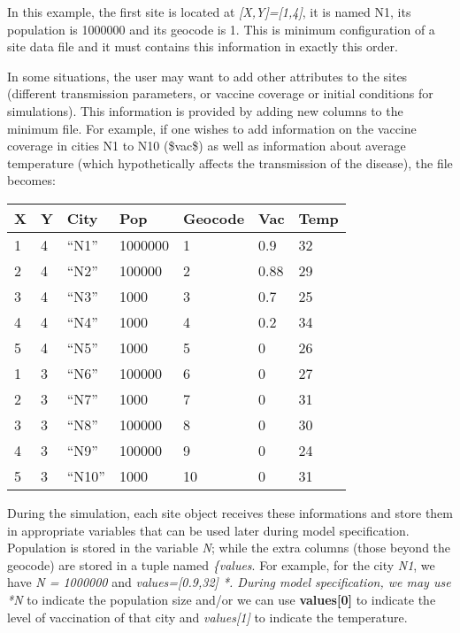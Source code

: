 \documentclass[a4paper,10pt]{manual}
\begin{document}
In this example, the first site is located at \emph{{[}X,Y{]}={[}1,4{]}}, it is named N1, its population is 1000000 and its geocode is 1. This is minimum configuration of a site data file and it must contains this information in exactly this order.

In some situations, the user may want to add other attributes to the sites (different transmission parameters, or vaccine coverage or initial conditions for simulations). This information is provided by adding new columns to the minimum file. For example, if one wishes to add information on the vaccine coverage in cities N1 to N10 (\$vac\$) as well as information about average temperature (which hypothetically affects the transmission of the disease), the file becomes:

\begin{tabulary}{\textwidth}{|L|L|L|L|L|L|L|}
\hline
\textbf{
X
} & \textbf{
Y
} & \textbf{
City
} & \textbf{
Pop
} & \textbf{
Geocode
} & \textbf{
Vac
} & \textbf{
Temp
}\\
\hline

1
 & 
4
 & 
``N1''
 & 
1000000
 & 
1
 & 
0.9
 & 
32
\\

2
 & 
4
 & 
``N2''
 & 
100000
 & 
2
 & 
0.88
 & 
29
\\

3
 & 
4
 & 
``N3''
 & 
1000
 & 
3
 & 
0.7
 & 
25
\\

4
 & 
4
 & 
``N4''
 & 
1000
 & 
4
 & 
0.2
 & 
34
\\

5
 & 
4
 & 
``N5''
 & 
1000
 & 
5
 & 
0
 & 
26
\\

1
 & 
3
 & 
``N6''
 & 
100000
 & 
6
 & 
0
 & 
27
\\

2
 & 
3
 & 
``N7''
 & 
1000
 & 
7
 & 
0
 & 
31
\\

3
 & 
3
 & 
``N8''
 & 
100000
 & 
8
 & 
0
 & 
30
\\

4
 & 
3
 & 
``N9''
 & 
100000
 & 
9
 & 
0
 & 
24
\\

5
 & 
3
 & 
``N10''
 & 
1000
 & 
10
 & 
0
 & 
31
\\
\hline
\end{tabulary}


During the simulation, each site object receives these informations and store them in appropriate variables that can be used later during model specification. Population is stored in the variable  \emph{N}; while the extra columns (those beyond the geocode) are stored in a tuple named \emph{\{values}. For example, for the city  \emph{N1}, we have  \emph{N = 1000000} and  \emph{values={[}0.9,32{]} *. During model specification, we may use  *N} to indicate the population size and/or we can use \textbf{values{[}0{]}} to indicate the level of vaccination of that city and \emph{values{[}1{]}} to indicate the temperature.
\end{document}
